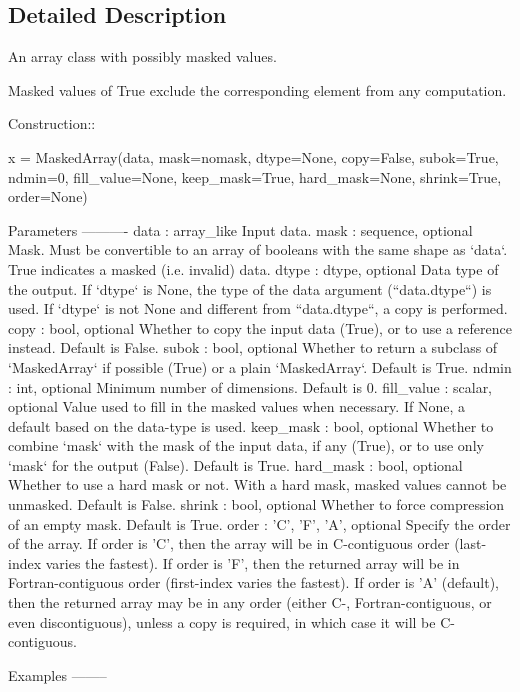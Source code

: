 \subsection{Detailed Description}
\begin{DoxyVerb}An array class with possibly masked values.

Masked values of True exclude the corresponding element from any
computation.

Construction::

  x = MaskedArray(data, mask=nomask, dtype=None, copy=False, subok=True,
                  ndmin=0, fill_value=None, keep_mask=True, hard_mask=None,
                  shrink=True, order=None)

Parameters
----------
data : array_like
    Input data.
mask : sequence, optional
    Mask. Must be convertible to an array of booleans with the same
    shape as `data`. True indicates a masked (i.e. invalid) data.
dtype : dtype, optional
    Data type of the output.
    If `dtype` is None, the type of the data argument (``data.dtype``)
    is used. If `dtype` is not None and different from ``data.dtype``,
    a copy is performed.
copy : bool, optional
    Whether to copy the input data (True), or to use a reference instead.
    Default is False.
subok : bool, optional
    Whether to return a subclass of `MaskedArray` if possible (True) or a
    plain `MaskedArray`. Default is True.
ndmin : int, optional
    Minimum number of dimensions. Default is 0.
fill_value : scalar, optional
    Value used to fill in the masked values when necessary.
    If None, a default based on the data-type is used.
keep_mask : bool, optional
    Whether to combine `mask` with the mask of the input data, if any
    (True), or to use only `mask` for the output (False). Default is True.
hard_mask : bool, optional
    Whether to use a hard mask or not. With a hard mask, masked values
    cannot be unmasked. Default is False.
shrink : bool, optional
    Whether to force compression of an empty mask. Default is True.
order : {'C', 'F', 'A'}, optional
    Specify the order of the array.  If order is 'C', then the array
    will be in C-contiguous order (last-index varies the fastest).
    If order is 'F', then the returned array will be in
    Fortran-contiguous order (first-index varies the fastest).
    If order is 'A' (default), then the returned array may be
    in any order (either C-, Fortran-contiguous, or even discontiguous),
    unless a copy is required, in which case it will be C-contiguous.

Examples
--------


\end{DoxyVerb}
